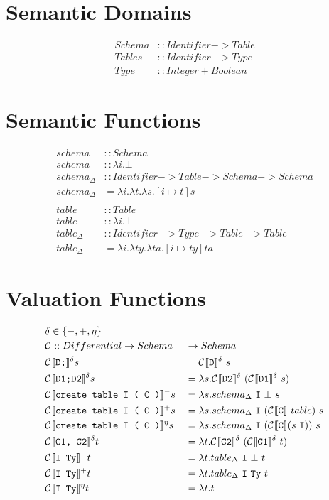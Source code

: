 \documentclass[12pt]{article}
\begin{document}
\section{Semantic Domains}
\begin{align*}
  Schema &:: Identifier -> Table \\
  Tables &:: Identifier -> Type \\
  Type &:: Integer + Boolean
\end{align*}

\section{Semantic Functions}
\begin{align*}
  schema &:: Schema \\
  schema &:: \lambda i.\bot \\
  schema_{\Delta} &:: Identifier -> Table -> Schema -> Schema \\
  schema_{\Delta} &= \lambda i. \lambda t. \lambda s. [ i \mapsto t ]s \\
  \\
  table &:: Table \\
  table &:: \lambda i.\bot \\
  table_{\Delta} &:: Identifier -> Type -> Table -> Table \\
  table_{\Delta} &= \lambda i. \lambda ty. \lambda ta. [ i \mapsto ty ]ta
\end{align*}

\section{Valuation Functions}

\begin{alignat*}{2}
  &\delta \in \{-, +, \eta \} &&\\
  &\compsymbol :: Differential -> Schema &&-> Schema \\
  &\comp{D;}{}^{\delta}s &&= \comp{D}{}^{\delta}\ s \\
  &\comp{D1;D2}{}^{\delta}s &&= \lambda s.\comp{D2}{}^{\delta}\ (\comp{D1}{}^{\delta}\ s) \\
  &\comp{create table I ( C )}{}^{-}s &&= \lambda s. schema_{\Delta}\ \mathtt{I}\ \bot\ s \\
  &\comp{create table I ( C )}{}^{+}s &&= \lambda s. schema_{\Delta}\ \mathtt{I}\ (\comp{C}{}\ table)\ s \\
  &\comp{create table I ( C )}{}{}^{\eta}s &&= \lambda s. schema_{\Delta}\ \mathtt{I}\ (\comp{C}{} (s\ \mathtt{I}))\ s\\
  &\comp{C1, C2}{}^{\delta}t &&= \lambda t.\comp{C2}{}^{\delta}\ (\comp{C1}{}^{\delta}\ t) \\
  &\comp{I Ty}{}^{-}t &&= \lambda t.table_{\Delta}\ \mathtt{I}\ \bot\ t \\
  &\comp{I Ty}{}^{+}t &&= \lambda t.table_{\Delta}\ \mathtt{I}\ \mathtt{Ty}\ t \\
  &\comp{I Ty}{}^{\eta}t &&= \lambda t. t \\
\end{alignat*}
\end{document}
